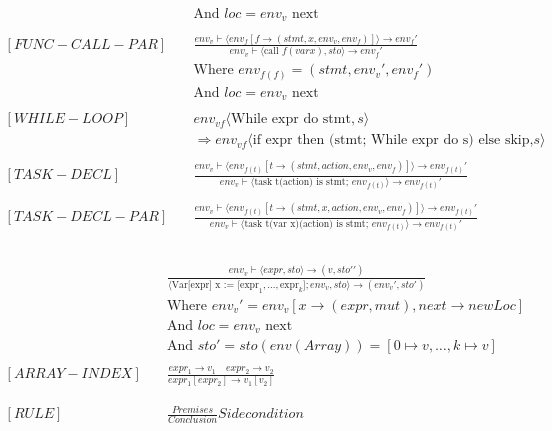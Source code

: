 \begin{align*}
                    & \text{And }loc = env_v \text{ next}  
    \\
    \\
    [FUNC-CALL-PAR] \quad &
    \frac
    {env_v \vdash \langle env_f[f \to (stmt, x, env_v, env_f)]\rangle\to env_f \prime}
    {env_v \vdash \langle \text{call }f(var x), sto\rangle \to env_f\prime}
    \\ & \text{Where }env_{f(f)} = (stmt, env_v\prime, env_f\prime) \\
                    & \text{And }loc = env_v \text{ next}   
    \\
    \\
    [WHILE-LOOP] \quad &
    env_{vf} \langle \text{While expr do stmt}, s \rangle \\ &  \Rightarrow env_{vf} \langle \text{if expr then (stmt; While expr do s) else skip,} s \rangle
    \\
    \\
    [TASK-DECL] \quad &
    \frac
    {env_v\vdash\langle env_{f(t)}[t \to (stmt, action, env_v, env_f)]\rangle \to env_{f(t)}\prime}
    {env_v \vdash \langle \text{task t(action) is stmt; } env_{f(t)} \rangle \to env_{f(t)}\prime}
    \\
    \\
    [TASK-DECL-PAR] \quad &
    \frac
    {env_v\vdash\langle env_{f(t)}[t \to (stmt, x, action, env_v, env_f)]\rangle \to env_{f(t)}\prime}
    {env_v \vdash \langle \text{task t(var x)(action) is stmt; } env_{f(t)} \rangle \to env_{f(t)}\prime}
    \\
    \\
\end{align*}


\begin{align*}
    [ARRAY-DECL] \quad &
    \frac
    {env_v \vdash\langle expr, sto\rangle\to (v, sto\prime \prime)}
    {\langle\text{Var[expr] x := } \text{[expr}_1, \dots, \text{expr}_k\text{]}; env_v,sto\rangle \to (env_v\prime, sto\prime)} \\
                         & \text{Where } env_v\prime = env_v[x \to (expr, mut), next \to new Loc]                                               \\
                         & \text{And } loc = env_v \text{ next}                               \\
                         & \text{And } sto\prime = sto(env(Array)) = [0 \mapsto v, \dots, k \mapsto v] 
    \\
    \\
    [ARRAY-INDEX] \quad &
    \frac
    {expr_1 \rightarrow v_1 \quad expr_2 \rightarrow v_2}
    {expr_1[expr_2] \rightarrow v_1[v_2]}
    \\
    \\
    \\
    [RULE]     \quad &
    \frac
    {Premises}
    {Conclusion}
    Side condition
\end{align*}
